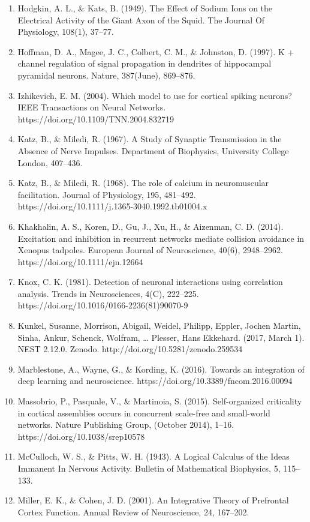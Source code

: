 \documentclass[11pt]{article}
\begin{document}
\begin{enumerate}
\item Hodgkin, A. L., \& Kats, B. (1949). The Effect of Sodium Ions on the Electrical Activity of the Giant Axon of the Squid. The Journal Of Physiology, 108(1), 37–77.
\item Hoffman, D. A., Magee, J. C., Colbert, C. M., \& Johnston, D. (1997). K + channel regulation of signal propagation in dendrites of hippocampal pyramidal neurons. Nature, 387(June), 869–876.
\item Izhikevich, E. M. (2004). Which model to use for cortical spiking neurons? IEEE Transactions on Neural Networks. https://doi.org/10.1109/TNN.2004.832719
\item Katz, B., \& Miledi, R. (1967). A Study of Synaptic Transmission in the Absence of Nerve Impulses. Department of Biophysics, University College London, 407–436.
\item Katz, B., \& Miledi, R. (1968). The role of calcium in neuromuscular facilitation. Journal of Physiology, 195, 481–492. https://doi.org/10.1111/j.1365-3040.1992.tb01004.x
\item Khakhalin, A. S., Koren, D., Gu, J., Xu, H., \& Aizenman, C. D. (2014). Excitation and inhibition in recurrent networks mediate collision avoidance in Xenopus tadpoles. European Journal of Neuroscience, 40(6), 2948–2962. https://doi.org/10.1111/ejn.12664
\item Knox, C. K. (1981). Detection of neuronal interactions using correlation analysis. Trends in Neurosciences, 4(C), 222–225. https://doi.org/10.1016/0166-2236(81)90070-9
\item Kunkel, Susanne, Morrison, Abigail, Weidel, Philipp, Eppler, Jochen Martin, Sinha, Ankur, Schenck, Wolfram, … Plesser, Hans Ekkehard. (2017, March 1). NEST 2.12.0. Zenodo. http://doi.org/10.5281/zenodo.259534
\item Marblestone, A., Wayne, G., \& Kording, K. (2016). Towards an integration of deep learning and neuroscience. https://doi.org/10.3389/fncom.2016.00094
\item Massobrio, P., Pasquale, V., \& Martinoia, S. (2015). Self-organized criticality in cortical assemblies occurs in concurrent scale-free and small-world networks. Nature Publishing Group, (October 2014), 1–16. https://doi.org/10.1038/srep10578
\item McCulloch, W. S., \& Pitts, W. H. (1943). A Logical Calculus of the Ideas Immanent In Nervous Activity. Bulletin of Mathematical Biophysics, 5, 115–133.
\item Miller, E. K., \& Cohen, J. D. (2001). An Integrative Theory of Prefrontal Cortex Function. Annual Review of Neuroscience, 24, 167–202.

\end{enumerate}
\end{document}

